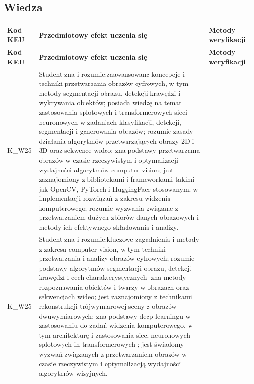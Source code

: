 \documentclass[12pt, a4paper]{article}
\newcommand{\thdrule}{\noalign{\global\setlength{\extrarowheight}{0pt}}}
\newcommand{\thdend}{\noalign{\global\setlength{\extrarowheight}{3pt}}}
\begin{document}
\subsection*{Wiedza}
{\scriptsize
\begin{longtable}{m{1.6cm}m{9.0cm}m{4.2cm}}
\thdrule\toprule
\rowcolor{pjatkRed} {\color{white}\footnotesize\textbf{\vphantom{Ag}Kod KEU}} & {\color{white}\footnotesize\textbf{\vphantom{Ag}Przedmiotowy efekt uczenia się}} & {\color{white}\footnotesize\textbf{\vphantom{Ag}Metody weryfikacji}} \\
\midrule\thdend
\endfirsthead
\thdrule\toprule
\rowcolor{pjatkRed} {\color{white}\footnotesize\textbf{\vphantom{Ag}Kod KEU}} & {\color{white}\footnotesize\textbf{\vphantom{Ag}Przedmiotowy efekt uczenia się}} & {\color{white}\footnotesize\textbf{\vphantom{Ag}Metody weryfikacji}} \\
\midrule\thdend
\endhead
  \rowcolor{tableRowLight} K\_W25 & Student zna i rozumie:zaawansowane koncepcje i techniki przetwarzania obrazów cyfrowych, w tym metody segmentacji obrazu, detekcji krawędzi i wykrywania obiektów; posiada wiedzę na temat zastosowania splotowych i transformerowych sieci neuronowych w zadaniach klasyfikacji, detekcji, segmentacji i generowania obrazów; rozumie zasady działania algorytmów przetwarzających obrazy 2D i 3D oraz sekwence wideo; zna podstawy przetwarzania obrazów w czasie rzeczywistym i optymalizacji wydajności algorytmów computer vision; jest zaznajomiony z bibliotekami i frameworkami takimi jak OpenCV, PyTorch i HuggingFace stosowanymi w implementacji rozwiązań z zakresu widzenia komputerowego; rozumie wyzwania związane z przetwarzaniem dużych zbiorów danych obrazowych i metody ich efektywnego składowania i analizy. &  \\
  \rowcolor{tableRowAlt} K\_W25 & Student zna i rozumie:kluczowe zagadnienia i metody z zakresu computer vision, w tym techniki przetwarzania i analizy obrazów cyfrowych; rozumie podstawy algorytmów segmentacji obrazu, detekcji krawędzi i cech charakterystycznych; zna metody rozpoznawania obiektów i twarzy w obrazach oraz sekwencjach wideo; jest zaznajomiony z technikami rekonstrukcji trójwymiarowej sceny z obrazów dwuwymiarowych; zna podstawy deep learningu w zastosowaniu do zadań widzenia komputerowego, w tym architekturę i zastosowania sieci neuronowych splotowych in transformerowych ; jest świadomy wyzwań związanych z przetwarzaniem obrazów w czasie rzeczywistym i optymalizacją wydajności algorytmów wizyjnych. &  \\

\end{longtable}}
\end{document}
